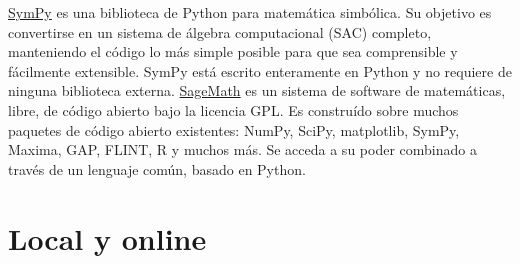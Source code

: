 \href{http://www.sympy.org/}{SymPy}
es una biblioteca de Python para matemática simbólica. Su objetivo es convertirse en 
un sistema de álgebra computacional (SAC) completo, manteniendo el código lo más simple 
posible para que sea comprensible y fácilmente extensible. SymPy está escrito enteramente 
en Python y no requiere de ninguna biblioteca externa.
% 
\href{http://www.sagemath.org/}{SageMath}  es un sistema de software
de matemáticas, libre, de código abierto bajo la licencia GPL. 
Es construído sobre  muchos paquetes de código abierto existentes: 
NumPy, SciPy, matplotlib, SymPy, Maxima, GAP, FLINT, R y muchos más.
Se acceda a su poder combinado a través de un lenguaje común, basado en Python.



\section{Local y online} 

